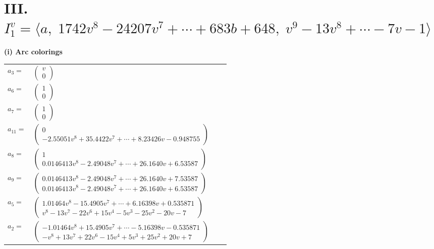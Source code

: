 \documentclass[1p]{elsarticle_modified}
\theoremstyle{definition}
\begin{document}
\centering \section*{III. $I^v_{1}= \langle a,\;1742 v^8-24207 v^7+\cdots+683 b+648,\;v^9-13 v^8+\cdots-7 v-1 \rangle$}
\flushleft \textbf{(i) Arc colorings}\\
\begin{tabular}{m{7pt} m{180pt} m{7pt} m{180pt} }
\flushright $a_{3}=$&$\begin{pmatrix}v\\0\end{pmatrix}$ \\
\flushright $a_{6}=$&$\begin{pmatrix}1\\0\end{pmatrix}$ \\
\flushright $a_{7}=$&$\begin{pmatrix}1\\0\end{pmatrix}$ \\
\flushright $a_{11}=$&$\begin{pmatrix}0\\-2.55051 v^{8}+35.4422 v^{7}+\cdots+8.23426 v-0.948755\end{pmatrix}$ \\
\flushright $a_{8}=$&$\begin{pmatrix}1\\0.0146413 v^{8}-2.49048 v^{7}+\cdots+26.1640 v+6.53587\end{pmatrix}$ \\
\flushright $a_{9}=$&$\begin{pmatrix}0.0146413 v^{8}-2.49048 v^{7}+\cdots+26.1640 v+7.53587\\0.0146413 v^{8}-2.49048 v^{7}+\cdots+26.1640 v+6.53587\end{pmatrix}$ \\
\flushright $a_{5}=$&$\begin{pmatrix}1.01464 v^{8}-15.4905 v^{7}+\cdots+6.16398 v+0.535871\\v^8-13 v^7-22 v^6+15 v^4-5 v^3-25 v^2-20 v-7\end{pmatrix}$ \\
\flushright $a_{2}=$&$\begin{pmatrix}-1.01464 v^{8}+15.4905 v^{7}+\cdots-5.16398 v-0.535871\\- v^8+13 v^7+22 v^6-15 v^4+5 v^3+25 v^2+20 v+7\end{pmatrix}$ \\

\end{tabular}
\end{document}
